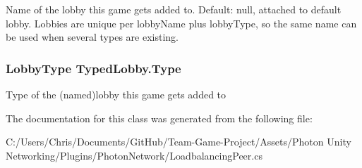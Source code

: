 Name of the lobby this game gets added to. Default\+: null, attached to default lobby. Lobbies are unique per lobby\+Name plus lobby\+Type, so the same name can be used when several types are existing.

\subsubsection[{\texorpdfstring{Type}{Type}}]{\setlength{\rightskip}{0pt plus 5cm}Lobby\+Type Typed\+Lobby.\+Type}\hypertarget{class_typed_lobby_a6f007dbaead56a950745524463ce5219}{}\label{class_typed_lobby_a6f007dbaead56a950745524463ce5219}


Type of the (named)lobby this game gets added to



The documentation for this class was generated from the following file\+:\begin{DoxyCompactItemize}
\item 
C\+:/\+Users/\+Chris/\+Documents/\+Git\+Hub/\+Team-\/\+Game-\/\+Project/\+Assets/\+Photon Unity Networking/\+Plugins/\+Photon\+Network/Loadbalancing\+Peer.\+cs\end{DoxyCompactItemize}
